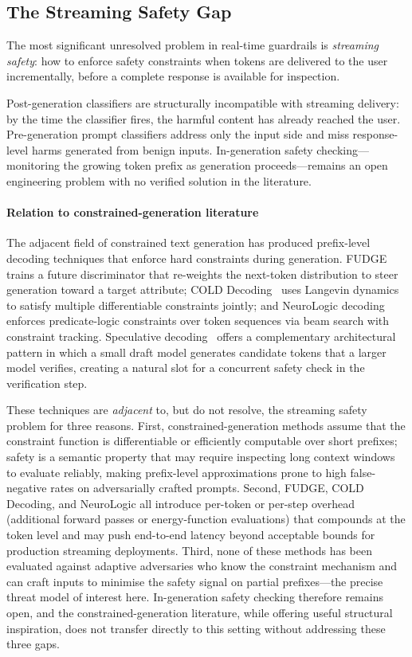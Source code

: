 \subsection{The Streaming Safety Gap}
\label{subsec:streaming_gap}

The most significant unresolved problem in real-time guardrails is \emph{streaming
safety}: how to enforce safety constraints when tokens are delivered to the user
incrementally, before a complete response is available for inspection.

Post-generation classifiers are structurally incompatible with streaming delivery:
by the time the classifier fires, the harmful content has already reached the user.
Pre-generation prompt classifiers address only the input side and miss
response-level harms generated from benign inputs.
In-generation safety checking---monitoring the growing token prefix as generation
proceeds---remains an open engineering problem with no verified solution in the
literature.

\paragraph{Relation to constrained-generation literature}
The adjacent field of constrained text generation has produced prefix-level
decoding techniques that enforce hard constraints during generation.
FUDGE~\cite{yang2021fudge} trains a future discriminator that re-weights the
next-token distribution to steer generation toward a target attribute; COLD
Decoding~\cite{qin2022cold} uses Langevin dynamics to satisfy multiple
differentiable constraints jointly; and NeuroLogic
decoding~\cite{lu2021neurologic} enforces predicate-logic constraints over
token sequences via beam search with constraint tracking.
Speculative decoding~\cite{leviathan2023fast} offers a complementary
architectural pattern in which a small draft model generates candidate tokens
that a larger model verifies, creating a natural slot for a concurrent safety
check in the verification step.

These techniques are \emph{adjacent} to, but do not resolve, the streaming
safety problem for three reasons.
First, constrained-generation methods assume that the constraint function is
differentiable or efficiently computable over short prefixes; safety is
a semantic property that may require inspecting long context windows to evaluate
reliably, making prefix-level approximations prone to high false-negative rates
on adversarially crafted prompts.
Second, FUDGE, COLD Decoding, and NeuroLogic all introduce per-token or per-step
overhead (additional forward passes or energy-function evaluations) that compounds
at the token level and may push end-to-end latency beyond acceptable bounds for
production streaming deployments.
Third, none of these methods has been evaluated against adaptive adversaries who
know the constraint mechanism and can craft inputs to minimise the safety
signal on partial prefixes---the precise threat model of interest here.
In-generation safety checking therefore remains open, and the constrained-generation
literature, while offering useful structural inspiration, does not transfer directly
to this setting without addressing these three gaps.

